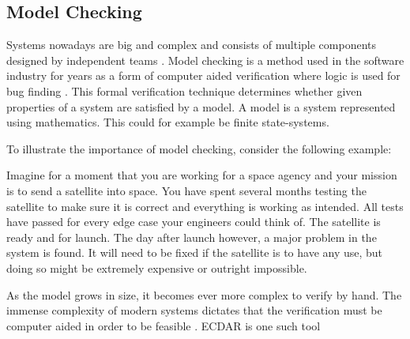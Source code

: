 \subsection{Model Checking}

Systems nowadays are big and complex and consists of multiple components designed by independent teams \cite{ecdartheory}. Model checking is a method used in the software industry for years as a form of computer aided verification where logic is used for bug finding \cite{modelchecking_handbook}. This formal verification technique determines whether given properties of a system are satisfied by a model. A model is a system represented using mathematics. This could for example be finite state-systems. 

To illustrate the importance of model checking, consider the following example:

Imagine for a moment that you are working for a space agency and your mission is to send a satellite into space.
You have spent several months testing the satellite to make sure it is correct and everything is working as intended.
All tests have passed for every edge case your engineers could think of.
The satellite is ready and for launch.
The day after launch however, a major problem in the system is found. 
It will need to be fixed if the satellite is to have any use, but doing so might be extremely expensive or outright impossible.

As the model grows in size, it becomes ever more complex to verify by hand.
The immense complexity of modern systems dictates that the verification must be computer aided in order to be feasible \cite{modelchecking_handbook}. ECDAR is one such tool

